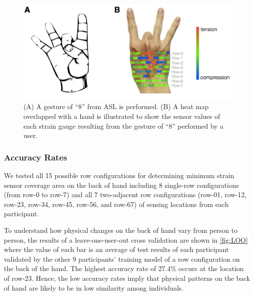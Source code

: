 \documentclass{sigchi}
\begin{document}
\begin{figure}[t]
 \begin{center}
  \includegraphics[width=0.9\columnwidth]{figures/Num8GestureV4.pdf}
  \caption{
    (A) A gesture of ``8'' from ASL is performed.
    (B) A heat map overlapped with a hand is illustrated to show the sensor values of each strain gauge resulting from the gesture of ``8'' performed by a user.
  }
  \label{fig:Num8Gesture}
  \end{center}
\end{figure}


\subsubsection{Accuracy Rates}
We tested all 15 possible row configurations for determining minimum strain sensor coverage area on the back of hand including 8 single-row configurations (from row-0 to row-7) and all 7 two-adjacent row configurations (row-01, row-12, row-23, row-34, row-45, row-56, and row-67) of sensing locations from each participant.

To understand how physical changes on the back of hand vary from person to person, the results of a leave-one-user-out cross validation are shown in \autoref{fig:LOO} where the value of each bar is an average of test results of each participant validated by the other 9 participants' training model of a row configuration on the back of the hand. The highest accuracy rate of 27.4\% occurs at the location of row-23. Hence, the low accuracy rates imply that physical patterns on the back of hand are likely to be in low similarity among individuals.
\end{document}
